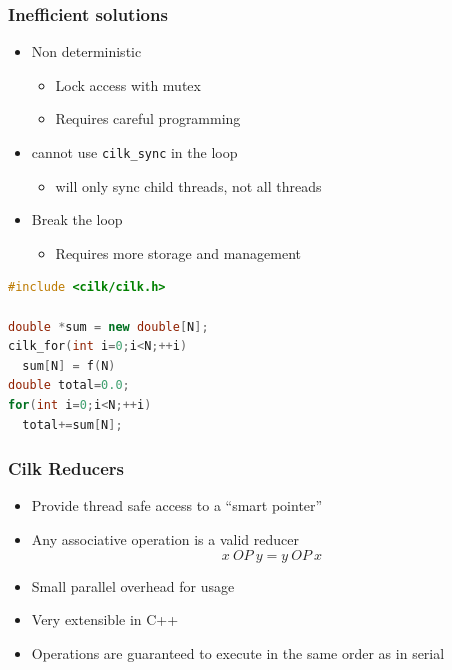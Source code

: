 \documentclass[fleqn,xcolor=table,10pt,final]{beamer}
\begin{document}
\begin{frame}[fragile]
  \frametitle{Inefficient solutions}
  \begin{itemize}
    \item Non deterministic
      \begin{itemize}
        \item Lock access with mutex
        \item Requires careful programming
      \end{itemize}
  \end{itemize}
  \begin{itemize}
    \item cannot use {\tt cilk\_sync} in the loop
      \begin{itemize}
        \item will only sync child threads, not all threads
      \end{itemize}
  \end{itemize}
  \begin{itemize}
    \item Break the loop
      \begin{itemize}
        \item Requires more storage and management
      \end{itemize}
  \end{itemize}
  \begin{lstlisting}[language=C++,basicstyle=\scriptsize]
#include <cilk/cilk.h>

double *sum = new double[N];
cilk_for(int i=0;i<N;++i)
  sum[N] = f(N)
double total=0.0;
for(int i=0;i<N;++i)
  total+=sum[N];
  \end{lstlisting}
\end{frame}

\begin{frame}
  \frametitle{Cilk Reducers}
  \begin{itemize}
    \item Provide thread safe access to a ``smart pointer''
    \item Any associative operation is a valid reducer
      \begin{equation*}
        x\ OP\ y = y\ OP\ x
      \end{equation*}
    \item Small parallel overhead for usage
    \item Very extensible in C++
    \item Operations are guaranteed to execute in the same order as in serial
  \end{itemize}
\end{frame}
\end{document}
